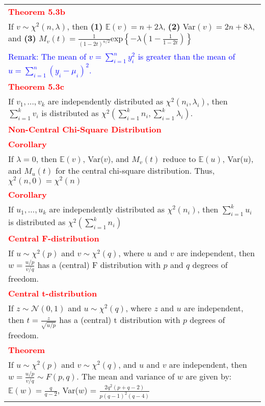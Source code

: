 \documentclass[a4paper,11pt]{article}
\begin{document}
\begin{longtable}{|p{17 cm}|}
\hline
\textcolor{red}{\textbf{Theorem 5.3b}}\\
If $v\sim \chi^2(n,\lambda)$, then \textbf{(1)} $\mathbb{E}(v)=n+2\lambda$, \textbf{(2)} Var$(v)=2n+8\lambda$, and \textbf{(3)} $M_v(t)=\frac{1}{(1-2t)^{n/2}}\text{exp}\left\{ -\lambda \left( 1-\frac{1}{1-2t}\right)\right\}$\\
\textcolor{blue}{Remark: The mean of $v=\sum_{i=1}^ny_i^2$ is greater than the mean of $u=\sum_{i=1}^n(y_i-\mu_i)^2$.}\\
\hline
\textcolor{red}{\textbf{Theorem 5.3c}}\\
If \( v_1, \dots, v_k \) are independently distributed as \( \chi^2(n_i, \lambda_i) \), then \( \sum\limits_{i=1}^{k} v_i \) is distributed as $
    \chi^2 \left( \sum\limits_{i=1}^{k} n_i, \sum\limits_{i=1}^{k} \lambda_i \right).$\\
\hline
\newpage \hline
\textcolor{red}{\textbf{Non-Central Chi-Square Distribution}}\\
\hline
\textcolor{red}{\textbf{Corollary}} \\
If $\lambda = 0$, then $\mathbb{E}(v)$, Var($v$), and $M_v(t)$ reduce to $\mathbb{E}(u)$, Var($u$), and $M_u(t)$ for the central chi-square distribution. Thus, $\chi^2(n, 0) = \chi^2(n)$ \\
\hline
\textcolor{red}{\textbf{Corollary}} \\
If $u_1, \dots, u_k$ are independently distributed as $\chi^2(n_i)$, then $\sum_{i=1}^{k}{u_i}$ is distributed as $\chi^2(\sum_{i=1}^{k}{n_i})$\\
\hline
\textcolor{red}{\textbf{Central F-distribution}}\\
If $u \sim \chi^2(p)$ and $v \sim \chi^2(q)$, where $u$ and $v$ are independent, then $w=\frac{u/p}{v/q}$ has a (central) F distribution with $p$ and $q$ degrees of freedom.\\
\hline
\textcolor{red}{\textbf{Central t-distribution}}\\
If $z \sim \mathcal{N}(0,1)$ and $u \sim \chi^2(q)$, where $z$ and $u$ are independent, then $t=\frac{z}{\sqrt{u/p}}$ has a (central) t distribution with $p$ degrees of freedom.\\
\hline
\textcolor{red}{\textbf{Theorem}}\\
If $u \sim \chi^2(p)$ and $v \sim \chi^2(q)$, and $u$ and $v$ are independent, then $w=\frac{u/p}{v/q} \sim F(p, q)$. The mean and variance of $w$ are given by: $\mathbb{E}(w) = \frac{q}{q-2}$, Var($w$) = $\frac{2q^2(p+q-2)}{p(q-1)^2(q-4)}$\\

\end{longtable}
\end{document}
